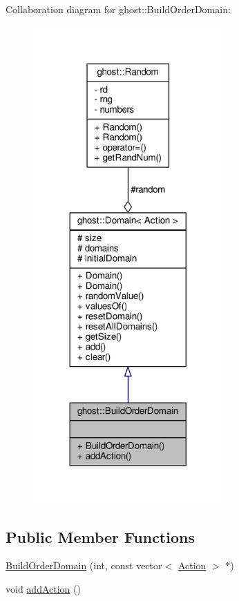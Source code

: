 Collaboration diagram for ghost\-:\-:Build\-Order\-Domain\-:
\nopagebreak
\begin{figure}[H]
\begin{center}
\leavevmode
\includegraphics[width=206pt]{classghost_1_1BuildOrderDomain__coll__graph}
\end{center}
\end{figure}
\subsection*{Public Member Functions}
\begin{DoxyCompactItemize}
\item 
\hyperlink{classghost_1_1BuildOrderDomain_a5cfeef0e729cb67dd15023fb30027cb1}{Build\-Order\-Domain} (int, const vector$<$ \hyperlink{classghost_1_1Action}{Action} $>$ $\ast$)
\item 
void \hyperlink{classghost_1_1BuildOrderDomain_aa81e66fde8858d7497c1ab2343cda6ee}{add\-Action} ()
\end{DoxyCompactItemize}
